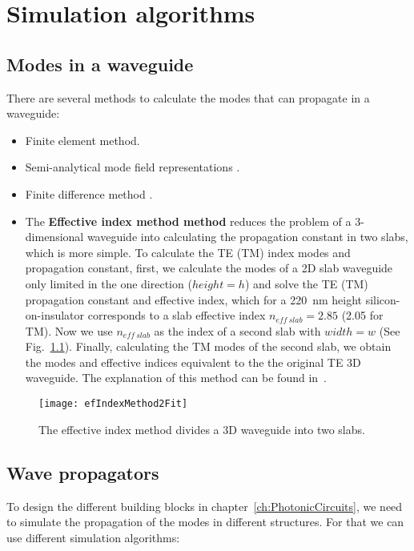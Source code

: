 \chapter{Simulation algorithms} %
\label{ch:simulations}

\section{Modes in a waveguide}
There are several methods to calculate the modes that can propagate in a waveguide:

\begin{itemize}
 \item Finite element method.
 \item Semi-analytical mode field representations \cite{Lohmeyer1997}.
 \item Finite difference method \cite{Fallahkhair2008}.
 \item The \textbf{Effective index method method} reduces the problem of a 3-dimensional waveguide into calculating the propagation constant in two slabs, which is more simple. To calculate the TE (TM) index modes and propagation constant, first, we calculate the modes of a 2D slab waveguide only limited in the one direction ($ height = h $) and solve the TE (TM) propagation constant and effective index, which for a 220~nm height silicon-on-insulator corresponds to a slab effective index $n_{eff~slab}=2.85$ (2.05 for TM). Now we use $n_{eff~slab}$ as the index of a second slab with $ width = w $ (See Fig.~\ref{fig:efIndexMethodFit2}).
Finally, calculating the TM modes of the second slab, we obtain the modes and effective indices equivalent to the the original TE 3D waveguide. The explanation of this method can be found in~\cite{Marcatili1988,Chiang1986}.

\end{itemize}

\begin{figure}[htb]
    \centering
    \texttt{[image: efIndexMethod2Fit]}
    \caption{The effective index method divides a 3D waveguide into two slabs.}
    \label{fig:efIndexMethodFit2}
\end{figure}


\section{Wave propagators}
To design the different building blocks in chapter~\ref{ch:PhotonicCircuits}, we need to simulate the propagation of the modes in different structures. For that we can use different simulation algorithms:

